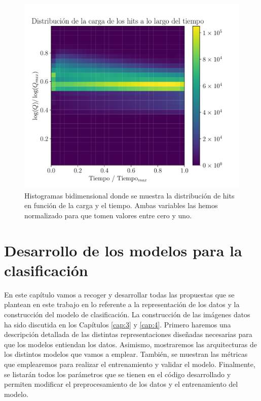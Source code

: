 \documentclass[a4paper,12pt,oneside,titlepage]{book}
\begin{document}
\begin{figure}[h!]
  \centering
  \includegraphics[scale=0.85]{hist_charge_time.pdf}
  \caption{Histogramas bidimensional donde se muestra la distribución de hits en función de la carga y el tiempo. Ambas variables las hemos normalizado para que tomen valores entre cero y uno.}
  \label{fig:hist_charge_t}
\end{figure}


\chapter{Desarrollo de los modelos para la clasificación}
\label{sec:arch}

En este capítulo vamos a recoger y desarrollar todas las propuestas que se plantean en este trabajo en lo referente a la representación de los datos y la construcción del modelo de clasificación. La construcción de las imágenes datos ha sido discutida en los Capítulos \ref{cap:3} y \ref{cap:4}. Primero haremos una descripción detallada de las distintas representaciones diseñadas necesarias para que los modelos entiendan los datos. Asimismo, mostraremos las arquitecturas de los distintos modelos que vamos a emplear. También, se muestran las métricas que emplearemos para realizar el entrenamiento y validar el modelo. Finalmente, se listarán todos los parámetros que se tienen en el código desarrollado y permiten modificar el preprocesamiento de los datos y el entrenamiento del modelo.
\end{document}
